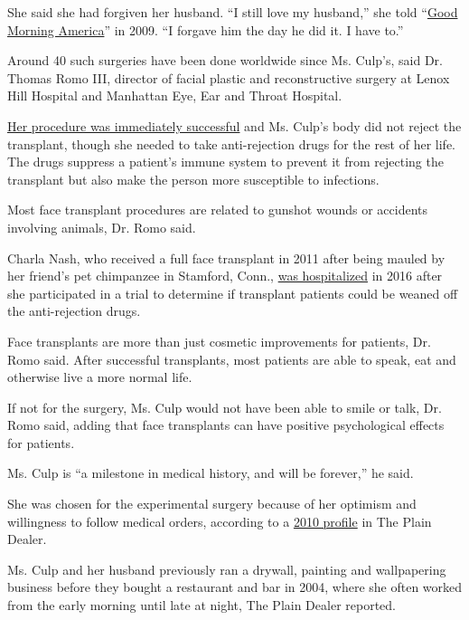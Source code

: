 She said she had forgiven her husband. ``I still love my husband,'' she
told
``\href{https://abcnews.go.com/Health/MindMoodNews/story?id=7535591}{Good
Morning America}'' in 2009. ``I forgave him the day he did it. I have
to.''

Around 40 such surgeries have been done worldwide since Ms. Culp's, said
Dr. Thomas Romo III, director of facial plastic and reconstructive
surgery at Lenox Hill Hospital and Manhattan Eye, Ear and Throat
Hospital.

\href{https://www.nytimes3xbfgragh.onion/2008/12/18/health/s18face.html}{Her
procedure was immediately successful} and Ms. Culp's body did not reject
the transplant, though she needed to take anti-rejection drugs for the
rest of her life. The drugs suppress a patient's immune system to
prevent it from rejecting the transplant but also make the person more
susceptible to infections.

Most face transplant procedures are related to gunshot wounds or
accidents involving animals, Dr. Romo said.

Charla Nash, who received a full face transplant in 2011 after being
mauled by her friend's pet chimpanzee in Stamford, Conn.,
\href{https://www.nytimes3xbfgragh.onion/2016/05/06/nyregion/chimpanzee-attack-victim-who-got-face-transplant-is-hospitalized.html}{was
hospitalized} in 2016 after she participated in a trial to determine if
transplant patients could be weaned off the anti-rejection drugs.

Face transplants are more than just cosmetic improvements for patients,
Dr. Romo said. After successful transplants, most patients are able to
speak, eat and otherwise live a more normal life.

If not for the surgery, Ms. Culp would not have been able to smile or
talk, Dr. Romo said, adding that face transplants can have positive
psychological effects for patients.

Ms. Culp is ``a milestone in medical history, and will be forever,'' he
said.

She was chosen for the experimental surgery because of her optimism and
willingness to follow medical orders, according to a
\href{https://www.cleveland.com/healthfit/2010/11/woman_who_underwent_first_near.html}{2010
profile} in The Plain Dealer.

Ms. Culp and her husband previously ran a drywall, painting and
wallpapering business before they bought a restaurant and bar in 2004,
where she often worked from the early morning until late at night, The
Plain Dealer reported.

